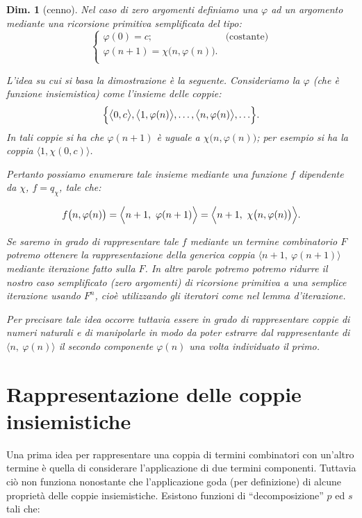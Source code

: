 \documentclass{book}
\newtheorem{dimostrazione}{Dim.}[chapter]
\begin{document}
\begin{dimostrazione}[cenno]
Nel caso di zero argomenti definiamo una $\varphi$ ad un argomento mediante 
una ricorsione primitiva semplificata del tipo:
\[
\left \{ \begin{array}{lc}
  \varphi(0) = c;  & \text{(costante)} \\
  \varphi(n + 1) = \chi\bigl(n , \varphi(n)\bigr). & \\
\end{array}
\right .
\]

L'idea su cui si basa la dimostrazione \`e la seguente. Consideriamo la 
$\varphi$ (che \`e funzione insiemistica) come l'insieme delle coppie: 
\[
\Bigl\{
\bigl \langle 0, c \bigr\rangle, \bigl\langle 1, \varphi(n) \bigr\rangle , 
\ldots , \bigl\langle n, 
\varphi(n) \bigr\rangle , \ldots 
\Bigr\}.
\] 
In tali coppie si ha che $\varphi(n + 1)$ \`e uguale a $\chi\bigl(n, \varphi(n)
\bigr)$; per esempio si ha la coppia $\langle 1, \chi(0, c) \rangle$. 

Pertanto possiamo enumerare tale insieme 
mediante una funzione $f$ dipendente da $\chi$, $f = q_{\chi}$, tale che:

\[
f\bigl(n, \varphi(n)\bigr) 
= \Bigl\langle n+1,\ \varphi(n+1) \Bigr\rangle 
= \Bigl\langle n+1,\ \chi \bigl(n, \varphi(n)\bigr) \Bigr\rangle.
\]

Se saremo in grado di rappresentare tale $f$ mediante un termine combinatorio 
$F$ potremo ottenere la rappresentazione della generica coppia $\langle n+1, \ 
\varphi(n+1) \rangle$ mediante iterazione fatto sulla $F$. In altre parole 
potremo potremo ridurre il nostro caso semplificato (zero argomenti) di 
ricorsione primitiva a una semplice iterazione usando $F^n$, cio\`e 
utilizzando gli iteratori come nel lemma d'iterazione.

Per precisare tale idea occorre tuttavia essere in grado di rappresentare 
coppie di numeri naturali e di manipolarle in modo da poter estrarre dal 
rappresentante di $\langle n, \ \varphi(n) \rangle$ il secondo componente 
$\varphi(n)$ una volta individuato il primo.
\end{dimostrazione}

\section{Rappresentazione delle coppie insiemistiche}
Una prima idea per rappresentare una coppia di termini combinatori con un'altro
 termine \`e quella di considerare l'applicazione di due termini componenti.
Tuttavia ci\`o non funziona nonostante che l'applicazione goda (per 
definizione) di alcune propriet\`a delle coppie insiemistiche. Esistono 
funzioni di ``decomposizione'' $p$ ed $s$ tali che:
\end{document}
